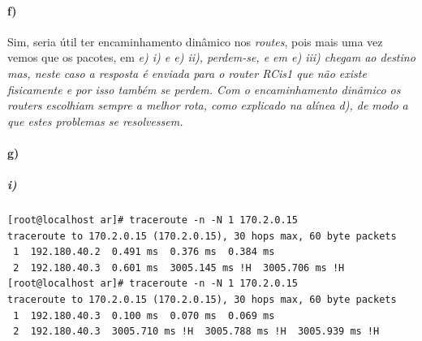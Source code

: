 \paragraph{f)}
Sim, seria útil ter encaminhamento dinâmico nos \emph{routes}, pois mais uma vez vemos que os pacotes, em \it{e) i)} e \it{e) ii)}, perdem-se, e em \it{e) iii)} chegam ao destino mas, neste caso a resposta é enviada para o \emph{router} \textsf{RCis1} que não existe fisicamente e por isso também se perdem. Com o encaminhamento dinâmico os \emph{routers} escolhiam sempre a melhor rota, como explicado na alínea \it{d)}, de modo a que estes problemas se resolvessem.

\paragraph{g)}
\subparagraph{i)}
\begin{verbatim}
[root@localhost ar]# traceroute -n -N 1 170.2.0.15
traceroute to 170.2.0.15 (170.2.0.15), 30 hops max, 60 byte packets
 1  192.180.40.2  0.491 ms  0.376 ms  0.384 ms
 2  192.180.40.3  0.601 ms  3005.145 ms !H  3005.706 ms !H
[root@localhost ar]# traceroute -n -N 1 170.2.0.15
traceroute to 170.2.0.15 (170.2.0.15), 30 hops max, 60 byte packets
 1  192.180.40.3  0.100 ms  0.070 ms  0.069 ms
 2  192.180.40.3  3005.710 ms !H  3005.788 ms !H  3005.939 ms !H
\end{verbatim}

